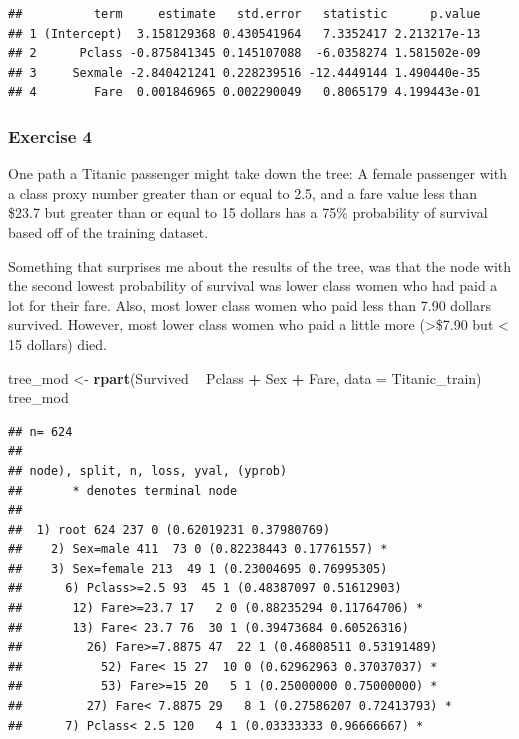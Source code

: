 \documentclass[]{article}
\newenvironment{Shaded}{\begin{snugshade}}{\end{snugshade}}
\newcommand{\KeywordTok}[1]{\textcolor[rgb]{0.13,0.29,0.53}{\textbf{#1}}}
\newcommand{\DataTypeTok}[1]{\textcolor[rgb]{0.13,0.29,0.53}{#1}}
\newcommand{\StringTok}[1]{\textcolor[rgb]{0.31,0.60,0.02}{#1}}
\newcommand{\OperatorTok}[1]{\textcolor[rgb]{0.81,0.36,0.00}{\textbf{#1}}}
\newcommand{\NormalTok}[1]{#1}
\begin{document}
\begin{verbatim}
##          term     estimate   std.error   statistic      p.value
## 1 (Intercept)  3.158129368 0.430541964   7.3352417 2.213217e-13
## 2      Pclass -0.875841345 0.145107088  -6.0358274 1.581502e-09
## 3     Sexmale -2.840421241 0.228239516 -12.4449144 1.490440e-35
## 4        Fare  0.001846965 0.002290049   0.8065179 4.199443e-01
\end{verbatim}

\subsubsection{Exercise 4}\label{exercise-4}

One path a Titanic passenger might take down the tree: A female
passenger with a class proxy number greater than or equal to 2.5, and a
fare value less than \$23.7 but greater than or equal to 15 dollars has
a 75\% probability of survival based off of the training dataset.

Something that surprises me about the results of the tree, was that the
node with the second lowest probability of survival was lower class
women who had paid a lot for their fare. Also, most lower class women
who paid less than 7.90 dollars survived. However, most lower class
women who paid a little more (\textgreater{}\$7.90 but \textless{} 15
dollars) died.

\begin{Shaded}
\begin{Highlighting}[]
\NormalTok{tree_mod <-}\StringTok{ }\KeywordTok{rpart}\NormalTok{(Survived }\OperatorTok{~}\StringTok{ }\NormalTok{Pclass }\OperatorTok{+}\StringTok{ }\NormalTok{Sex }\OperatorTok{+}\StringTok{ }\NormalTok{Fare, }\DataTypeTok{data =}\NormalTok{ Titanic_train)}
\NormalTok{tree_mod}
\end{Highlighting}
\end{Shaded}

\begin{verbatim}
## n= 624 
## 
## node), split, n, loss, yval, (yprob)
##       * denotes terminal node
## 
##  1) root 624 237 0 (0.62019231 0.37980769)  
##    2) Sex=male 411  73 0 (0.82238443 0.17761557) *
##    3) Sex=female 213  49 1 (0.23004695 0.76995305)  
##      6) Pclass>=2.5 93  45 1 (0.48387097 0.51612903)  
##       12) Fare>=23.7 17   2 0 (0.88235294 0.11764706) *
##       13) Fare< 23.7 76  30 1 (0.39473684 0.60526316)  
##         26) Fare>=7.8875 47  22 1 (0.46808511 0.53191489)  
##           52) Fare< 15 27  10 0 (0.62962963 0.37037037) *
##           53) Fare>=15 20   5 1 (0.25000000 0.75000000) *
##         27) Fare< 7.8875 29   8 1 (0.27586207 0.72413793) *
##      7) Pclass< 2.5 120   4 1 (0.03333333 0.96666667) *
\end{verbatim}
\end{document}
